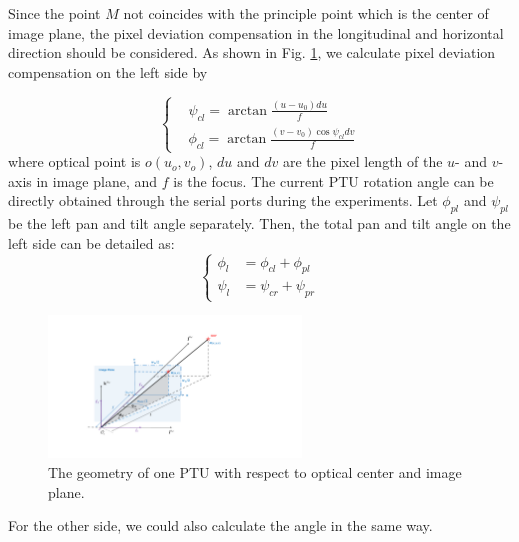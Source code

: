 Since the point ${M}$ not coincides with the principle point which is the center of image plane, the pixel deviation compensation in the longitudinal and horizontal direction should be considered. As shown in Fig. \ref{fig:Fig02_ImagePlaneOnly}, we calculate pixel deviation compensation on the left side by 

\begin{equation} 
\left \{
	\begin{split}
		& \psi_{cl} = \arctan \frac{(u-u_0)du}{f} \\
		& \phi_{cl} = \arctan \frac{(v-v_0)\cos\psi_{cl}dv}{f} 
	\end{split}
\right.
\end{equation}
where optical point is $o(u_o,v_o)$, $du$ and $dv$ are the pixel length of the $u$- and $v$-axis in image plane, and $f$ is the focus. The current PTU rotation angle can be directly obtained through the serial ports during the experiments. Let $\phi_{pl}$ and $\psi_{pl}$ be the left pan and tilt angle separately. Then, the total pan and tilt angle on the left side can be detailed as:
\begin{equation} 
\left \{
	\begin{split}
	    \phi_l &= \phi_{cl} + \phi_{pl} \\ 
	    \psi_l &= \psi_{cr} + \psi_{pr}
	\end{split}
\right.
\end{equation}

\begin{figure}[!th]
	\centering
	\includegraphics[width=0.6\textwidth]{Figs/chp03_vision_02_image_plane.pdf}
	\caption{The geometry of one PTU with respect to optical center and image plane.}
	\label{fig:Fig02_ImagePlaneOnly}
\end{figure}

For the other side, we could also calculate the angle in the same way. 

